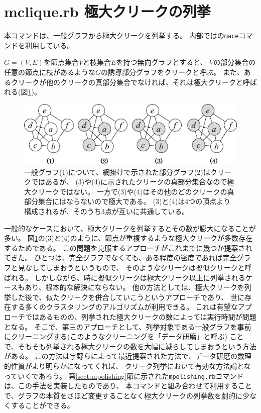 
\section{mclique.rb 極大クリークの列挙\label{sect:mclique}}

本コマンドは、一般グラフから極大クリークを列挙する。
内部では\cite{UnoWeb}の\verb|mace|コマンドを利用している。

$G=(V,E)$を節点集合$V$と枝集合$E$を持つ無向グラフとすると、
$V$の部分集合の任意の節点に枝があるような$G$の誘導部分グラフをクリークと呼ぶ。
また、あるクリークが他のクリークの真部分集合でなければ、それは極大クリークと呼ばれる(図\ref{fig:clique})。

\begin{figure}[htbp]
\begin{center}
\includegraphics[scale=0.5]{./clique.eps}
\caption{一般グラフ(1)について、網掛けで示された部分グラフ(2)はクリークではあるが、
(3)や(4)に示されたクリークの真部分集合なので極大クリークではない。
一方で(3)や(4)はその他のどのクリークの真部分集合にはならないので極大である。
(3)と(4)は4つの頂点より構成されるが、そのうち3点が互いに共通している。
\label{fig:clique}}
\end{center}
\end{figure} 

一般的なケースにおいて、極大クリークを列挙するとその数が膨大になることが多い。
図\ref{fig:clique}の(3)と(4)のように、節点が重複するような極大クリークが多数存在するためである。
この問題を克服するアプローチがこれまでに幾つか提案されてきた。
ひとつは、完全グラフでなくても、ある程度の密度であれば完全グラフと見なしてしまおうというもので、
そのようなクリークは擬似クリークと呼ばれる。
しかしながら、時に擬似クリークは極大クリーク以上に列挙されるケースもあり、根本的な解決にならない。
他の方法としては、極大クリークを列挙した後で、似たクリークを併合していこうというアプローチであり、
世に存在する多くのクラスタリングのアルゴリズムが利用できる。
これは有望なアプローチではあるものの、列挙された極大クリークの数によっては実行時間が問題となる。
そこで、第三のアプローチとして、列挙対象である一般グラフを事前にクリーニングする(このようなクリーニングを「データ研磨」と呼ぶ)
ことで、そもそも列挙される極大クリークの数を大幅に減らしてしまおうという方法がある。
この方法は宇野らによって最近提案された方法で\cite{Uno2014}、データ研磨の数理的性質がより明らかになってくれば、
クリーク列挙において有効な方法論となっていくであろう。
第\ref{sect:mpolishing}節に示された\verb|mpolishing.rb|コマンドは、この手法を実装したものであり、
本コマンドと組み合わせて利用することで、グラフの本質をさほど変更することなく極大クリークの列挙数を劇的に少なくすることができる。

